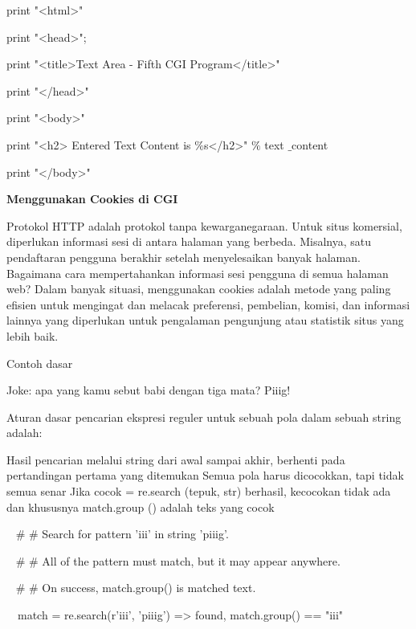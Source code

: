 \begin {enumerate}
\begin {enumerate}
\noindent
print "<html>" \par
\noindent
print "<head>"; \par
\noindent
print "<title>Text Area - Fifth CGI Program</title>" \par
\noindent
print "</head>" \par
\noindent
print "<body>" \par
\noindent
print "<h2> Entered Text Content is  $  \%  $s</h2>"  $  \%  $ text $  \_  $content \par
\noindent
print "</body>" \par
\vspace{12pt}
\noindent
{\fontsize{14pt}{14pt}\selectfont \textbf{Menggunakan Cookies di CGI} \\} \par
\noindent
Protokol HTTP adalah protokol tanpa kewarganegaraan. Untuk situs komersial, diperlukan informasi sesi di antara halaman yang berbeda. Misalnya, satu pendaftaran pengguna berakhir setelah menyelesaikan banyak halaman. Bagaimana cara mempertahankan informasi sesi pengguna di semua halaman web? Dalam banyak situasi, menggunakan cookies adalah metode yang paling efisien untuk mengingat dan melacak preferensi, pembelian, komisi, dan informasi lainnya yang diperlukan untuk pengalaman pengunjung atau statistik situs yang lebih baik. \par
\noindent
Contoh dasar \par
\noindent
Joke: apa yang kamu sebut babi dengan tiga mata? Piiig! \par
\vspace{12pt}
\noindent
Aturan dasar pencarian ekspresi reguler untuk sebuah pola dalam sebuah string adalah: \par
\noindent
Hasil pencarian melalui string dari awal sampai akhir, berhenti pada pertandingan pertama yang ditemukan  Semua pola harus dicocokkan, tapi tidak semua senar Jika cocok = re.search (tepuk, str) berhasil, kecocokan tidak ada dan khususnya match.group () adalah teks yang cocok \par
\vspace{12pt}
\noindent
~  $  \#  $ $  \#  $ Search for pattern 'iii' in string 'piiig'. \par
\noindent
~  $  \#  $ $  \#  $ All of the pattern must match, but it may appear anywhere. \par
\noindent
~  $  \#  $ $  \#  $ On success, match.group() is matched text. \par
\noindent
~~match = re.search(r'iii', 'piiig') =>  found, match.group() == "iii" \par

\end{enumerate}
\end{enumerate}
